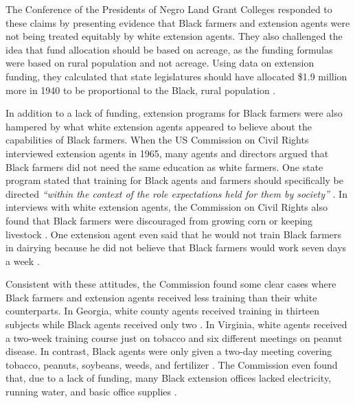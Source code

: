 \documentclass[12pt]{article}
\begin{document}
The Conference of the Presidents of Negro Land Grant Colleges responded to these claims by presenting evidence that Black farmers and extension agents were not being treated equitably by white extension agents.
They also challenged the idea that fund allocation should be based on acreage, as the funding formulas were based on rural population and not acreage.
Using data on extension funding, they calculated that state legislatures should have allocated \$1.9 million more in 1940 to be proportional to the Black, rural population \citep{wilkerson_agricultural_1942}.


In addition to a lack of funding, extension programs for Black farmers were also hampered by what white extension agents appeared to believe about the capabilities of Black farmers.
When the US Commission on Civil Rights interviewed extension agents in 1965, many agents and directors argued that Black farmers did not need the same education as white farmers.
One state program stated that training for Black agents and farmers should specifically be directed \textit{``within the context of the role expectations held for them by society''} \citep[pg. 33]{us_commission_on_civil_rights_equal_1965}. 
In interviews with white extension agents, the Commission on Civil Rights also found that Black farmers were discouraged from growing corn or keeping livestock \citep{us_commission_on_civil_rights_equal_1965}.
One extension agent even said that he would not train Black farmers in dairying because he did not believe that Black farmers would work seven days a week \citep[pg. 37]{us_commission_on_civil_rights_equal_1965}. 

Consistent with these attitudes, the Commission found some clear cases where Black farmers and extension agents received less training than their white counterparts.
In Georgia, white county agents received training in thirteen subjects while Black agents received only two \citep[pg. 31]{us_commission_on_civil_rights_equal_1965}. 
In Virginia, white agents received a two-week training course just on tobacco and six different meetings on peanut disease. 
In contrast, Black agents were only given a two-day meeting covering tobacco, peanuts, soybeans, weeds, and fertilizer \citep[pg. 32]{us_commission_on_civil_rights_equal_1965}.
The Commission even found that, due to a lack of funding, many Black extension offices lacked electricity, running water, and basic office supplies \citep[pg. 29]{us_commission_on_civil_rights_equal_1965}.
\end{document}
